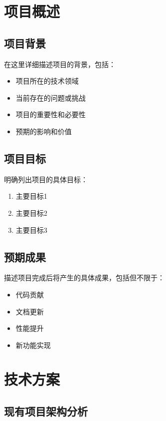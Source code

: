 \documentclass[a4paper,12pt]{article}
\begin{document}
\tableofcontents
\newpage

\section{项目概述}

\subsection{项目背景}
在这里详细描述项目的背景，包括：
\begin{itemize}
    \item 项目所在的技术领域
    \item 当前存在的问题或挑战
    \item 项目的重要性和必要性
    \item 预期的影响和价值
\end{itemize}

\subsection{项目目标}
明确列出项目的具体目标：
\begin{enumerate}
    \item 主要目标1
    \item 主要目标2
    \item 主要目标3
\end{enumerate}

\subsection{预期成果}
描述项目完成后将产生的具体成果，包括但不限于：
\begin{itemize}
    \item 代码贡献
    \item 文档更新
    \item 性能提升
    \item 新功能实现
\end{itemize}

\section{技术方案}

\subsection{现有项目架构分析}
\end{document}
